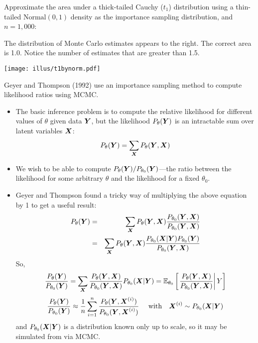 Approximate the area under a thick-tailed Cauchy ($t_1$) distribution using a thin-tailed $\mathrm{Normal}(0,1)$ density as the importance sampling distribution, and $n=1,000$:

\begin{minipage}{.4\textwidth}
The distribution of Monte Carlo estimates appears to the right.  The correct area is 1.0.  Notice the number of estimates that are greater than 1.5.
\end{minipage}
\hfill
\begin{minipage}{.5\textwidth}
\begin{center}
\texttt{[image: illus/t1bynorm.pdf]}
\end{center} 
\end{minipage}



Geyer and Thompson (1992) use an importance sampling method to compute likelihood ratios using MCMC.  
\begin{itemize}
\item The basic inference problem is to compute the relative likelihood for different values of $\theta$ given data $\bY$, but the likelihood $P_\theta(\bY)$ is an intractable sum over latent variables $\bX$:
\[
	P_\theta(\bY) = \sum_{\bX} P_\theta(\bY,\bX)
\]
\item We wish to be able to compute $P_\theta(\bY) / P_{\theta_{0}}(\bY)$---the ratio between the likelihood for some arbitrary $\theta$ and the likelihood for a fixed $\theta_0$.
\item Geyer and Thompson found a tricky way of multiplying the above equation by 1 to get a useful result:
\newpage
\addtolength{\jot}{2ex}
\begin{eqnarray*}
P_\theta(\bY) & = &\sum_{\bX} P_\theta(\bY,\bX)\frac{P_{\theta_0}(\bY,\bX)}{P_{\theta_0}(\bY,\bX)} \\
& = &\sum_{\bX} P_\theta(\bY,\bX)\frac{P_{\theta_0}(\bX|\bY)P_{\theta_0}(\bY)}{P_{\theta_0}(\bY,\bX)} \\
\end{eqnarray*}   
So,
\[
	\frac{P_\theta(\bY)}{P_{\theta_0}(\bY)} = \sum_{\bX} \frac{P_\theta(\bY,\bX)}{P_{\theta_0}(\bY,\bX)}
	P_{\theta_0}(\bX|\bY) = 
	\Exp_{\theta_0}\left[\left. \frac{P_\theta(\bY,\bX)}{P_{\theta_0}(\bY,\bX)}  \right| Y \right]
\]
\[
	\frac{P_\theta(\bY)}{P_{\theta_0}(\bY)} \approx \frac{1}{n}\sum_{i=1}^n
	 \frac{P_\theta(\bY,\bX^{(i)})}{P_{\theta_0}(\bY,\bX^{(i)})}~~~~\mathrm{with}~~~
	 \bX^{(i)} \sim P_{\theta_0}(\bX|\bY)
\]
and $P_{\theta_0}(\bX|\bY)$ is a distribution known only up to scale, so it may be simulated from via MCMC.
\end{itemize}


